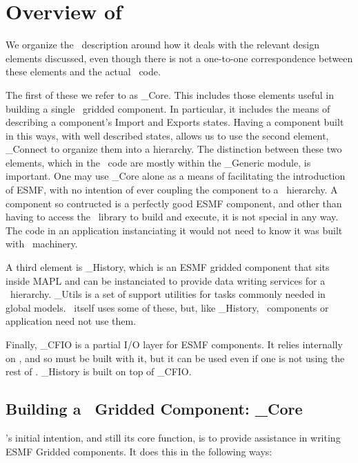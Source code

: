 \section{Overview of \ggn}

We organize the \ggn\   description around how it deals with the
relevant design elements discussed, even though there is not a one-to-one
correspondence between these elements and the actual \ggn\  code.

The first of these we refer to as \ggn\_Core. This includes those elements
useful in building a single \ggn\  gridded component. In particular,
it includes the means of describing a component's Import and Exports states.
Having a component built in this ways, with well described states, 
allows us to use the second element, \ggn\_Connect to organize them
into a hierarchy. The distinction between these two elements, which in
the \ggn\  code are mostly within the \ggn\_Generic module, is important.
One may use \ggn\_Core alone as a means of facilitating the introduction
of ESMF, with no intention of ever coupling the component to a 
\ggn\  hierarchy. A component so contructed is a perfectly good
ESMF component, and other than having to access the \ggn\  library
to build and execute, it is not special in any way. The code in 
an application instanciating  it would not need to know it was built 
with \ggn\  machinery.

A third element is \ggn\_History, which is an ESMF gridded component that
sits inside MAPL and can be instanciated to provide data writing services
for a \ggn\  hierarchy. \ggn\_Utils is a set of support utilities 
for tasks commonly needed in global models. \ggn\  itself uses some of
these, but, like \ggn\_History,  \ggn\  components or application
need not use them.

Finally, \ggn\_CFIO is a partial I/O layer for ESMF components. 
It relies internally on \ggn , and so must be built with it, but it
can be used even if one is not using the rest of \ggn . \ggn\_History
is built on top of \ggn\_CFIO.

\subsection{Building a \ggn\  Gridded Component: \ggn\_Core}


\ggn 's initial intention, and still its core function, is
to provide assistance in writing ESMF Gridded components. It does this
in the following ways:


